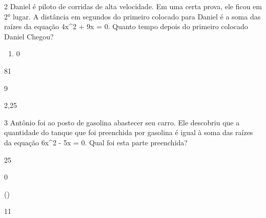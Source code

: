 \num{2} Daniel é piloto de corridas de alta velocidade. Em uma certa prova,
ele ficou em 2° lugar. A distância em segundos do primeiro colocado para
Daniel é a soma das raízes da equação 4x^2 + 9x = 0. Quanto tempo depois
do primeiro colocado Daniel Chegou?

\begin{enumerate}tlist
\item
  0
\end{enumerate}
\item 81
\item 9
\item 2,25
















\num{3} Antônio foi ao posto de gasolina abastecer seu carro. Ele descobriu
que a quantidade do tanque que foi preenchida por gasolina é igual à
soma das raízes da equação 6x^2 - 5x = 0. Qual foi esta parte preenchida?
\item 25
\item 0
\item ()
\item 11

